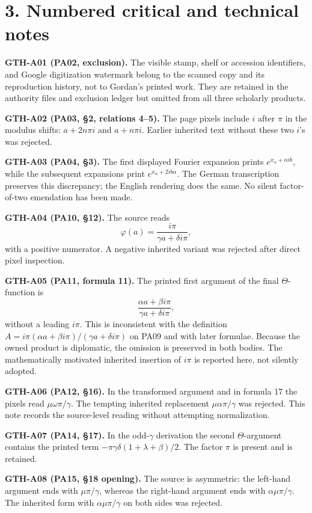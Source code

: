\documentclass[10pt]{article}
\newcommand{\noteid}[1]{\textbf{#1}}
\begin{document}
\section*{3. Numbered critical and technical notes}

\noteid{GTH-A01 (PA02, exclusion).} The visible stamp, shelf or accession identifiers, and Google digitization watermark belong to the scanned copy and its reproduction history, not to Gordan's printed work. They are retained in the authority files and exclusion ledger but omitted from all three scholarly products.

\noteid{GTH-A02 (PA03, \S 2, relations 4--5).} The page pixels include \(i\) after \(\pi\) in the modulus shifts: \(a+2n\pi i\) and \(a+n\pi i\). Earlier inherited text without these two \(i\)'s was rejected.

\noteid{GTH-A03 (PA04, \S 3).} The first displayed Fourier expansion prints \(e^{x_{\alpha}+\alpha ib}\), while the subsequent expansions print \(e^{x_{\alpha}+2ib\alpha}\). The German transcription preserves this discrepancy; the English rendering does the same. No silent factor-of-two emendation has been made.

\noteid{GTH-A04 (PA10, \S 12).} The source reads
\[
\varphi(a)=\frac{i\pi}{\gamma a+\delta i\pi},
\]
with a positive numerator. A negative inherited variant was rejected after direct pixel inspection.

\noteid{GTH-A05 (PA11, formula 11).} The printed first argument of the final \(\Theta\)-function is
\[
\frac{\alpha a+\beta i\pi}{\gamma a+\delta i\pi},
\]
without a leading \(i\pi\). This is inconsistent with the definition \(A=i\pi(\alpha a+\beta i\pi)/(\gamma a+\delta i\pi)\) on PA09 and with later formulae. Because the owned product is diplomatic, the omission is preserved in both bodies. The mathematically motivated inherited insertion of \(i\pi\) is reported here, not silently adopted.

\noteid{GTH-A06 (PA12, \S 16).} In the transformed argument and in formula 17 the pixels read \(\mu\omega\pi/\gamma\). The tempting inherited replacement \(\mu\alpha\pi/\gamma\) was rejected. This note records the source-level reading without attempting normalization.

\noteid{GTH-A07 (PA14, \S 17).} In the odd-\(\gamma\) derivation the second \(\Theta\)-argument contains the printed term \(-\pi\gamma\delta(1+\lambda+\beta)/2\). The factor \(\pi\) is present and is retained.

\noteid{GTH-A08 (PA15, \S 18 opening).} The source is asymmetric: the left-hand argument ends with \(\mu\pi/\gamma\), whereas the right-hand argument ends with \(\alpha\mu\pi/\gamma\). The inherited form with \(\alpha\mu\pi/\gamma\) on both sides was rejected.
\end{document}
